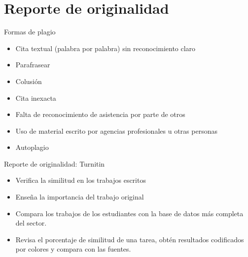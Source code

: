 \documentclass[
10pt,
aspectratio=169,
]{beamer}
\begin{document}
\section{Reporte de originalidad}
\begin{frame}{Formas de plagio}
\begin{itemize}
\item Cita textual (palabra por palabra) sin reconocimiento claro
\item Parafrasear
\item Colusi\'on
\item Cita inexacta
\item Falta de reconocimiento de asistencia por parte de otros
\item Uso de material escrito por agencias profesionales u otras personas
\item Autoplagio
\end{itemize}
\end{frame}

\begin{frame}{Reporte de originalidad: Turnitin}
\begin{itemize}
\item Verifica la similitud en los trabajos escritos
\item Enseña la importancia del trabajo original
\item Compara los trabajos de los estudiantes con la base de datos más completa del sector.
\item Revisa el porcentaje de similitud de una tarea, obtén resultados codificados por colores y compara con las fuentes.
\end{itemize}
\end{frame}
\end{document}
